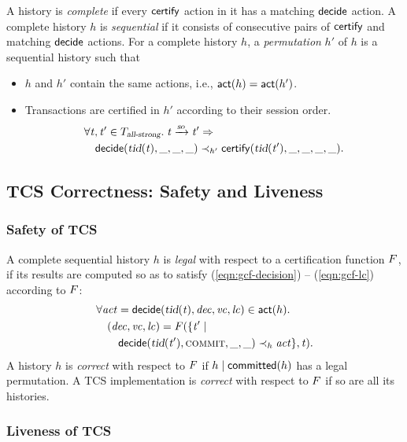 A history is \emph{complete} if every ${\sf certify}$ action
in it has a matching ${\sf decide}$ action.
A complete history $h$ is \emph{sequential} if
it consists of consecutive pairs of ${\sf certify}$ and matching ${\sf decide}$ actions.
For a complete history $h$, a \emph{permutation} $h'$ of $h$
is a sequential history such that
\begin{itemize}
  \item $h$ and $h'$ contain the same actions, i.e., ${\sf act}(h) = {\sf act}(h')$.
  \item Transactions are certified in $h'$ according to their session order.
    \begin{align*}
      &\forall \tvar, \tvar' \in \allstrongtxs.\;
        \tvar \rel{\so} \tvar' \implies \\
          &\quad \intdecide(\tidselector(\tvar), \_, \_, \_) \prec_{h'}
            \intcertify(\tidselector(\tvar'), \_, \_, \_, \_).
    \end{align*}
\end{itemize}
\subsection{TCS Correctness: Safety and Liveness} \label{ss:tcs-correctness}

\subsubsection{Safety of TCS} \label{ss:tcs-safety}

A complete sequential history $h$ is \emph{legal} with respect to
a certification function $F$,
if its results are computed so as to satisfy
(\ref{eqn:gcf-decision}) -- (\ref{eqn:gcf-lc}) according to $F$:
\begin{align*}
  &\forall \mathit{act} = {\sf decide}(\textsl{tid}(\mathit{t}), \mathit{dec}, \mathit{vc},
    \mathit{lc}) \in {\sf act}(h). \\
    &\quad (\mathit{dec}, \mathit{vc}, \mathit{lc})
      = F(\{\mathit{t}' \mid \\
        &\quad\quad {\sf decide}(\textsl{tid}(\mathit{t}'), \textsc{commit}, \_, \_) \prec_{h} \mathit{act}\}, \mathit{t}).
\end{align*}
A history $h$ is \emph{correct} with respect to $F$
if $h \mid {\sf committed}(h)$ has a legal permutation.
A TCS implementation is \emph{correct} with respect to $F$
if so are all its histories.
\subsubsection{Liveness of TCS} \label{ss:tcs-liveness}


